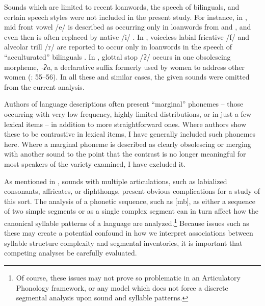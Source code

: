   Sounds which are limited to recent loanwords, the speech of bilinguals, and certain speech styles were not included in the present study. For instance, in , mid front vowel /e/ is described as occurring only in loanwords from  and , and even then is often replaced by native /i/ \citep[26]{Crawford1966}. In , voiceless labial fricative /f/ and alveolar trill /r/ are reported to occur only in loanwords in the speech of ``acculturated''  bilinguals \citep[13]{Kaufman1971}. In , glottal stop /ʔ/ occurs in one obsolescing morpheme, \textit{-ʔa}, a declarative suffix formerly used by women to address other women (\citealt{Cerrón-Palomino2006}: 55--56). In all these and similar cases, the given sounds were omitted from the current analysis.

  Authors of language descriptions often present ``marginal'' phonemes -- those occurring with very low frequency, highly limited distributions, or in just a few lexical items -- in addition to more straightforward ones. Where authors show these to be contrastive in lexical items, I have generally included such phonemes here. Where a marginal phoneme is described as clearly obsolescing or merging with another sound to the point that the contrast is no longer meaningful for most speakers of the variety examined, I have excluded it.

  As mentioned in , sounds with multiple articulations, such as labialized consonants, affricates, or diphthongs, present obvious complications for a study of this sort. The analysis of a phonetic sequence, such as [mb], as either a sequence of two simple segments or as a single complex segment can in turn affect how the canonical syllable patterns of a language are analyzed.\footnote{{Of course, these issues may not prove so problematic in an Articulatory Phonology framework, or any model which does not force a discrete segmental analysis upon sound and syllable patterns.}} Because issues such as these may create a potential confound in how we interpret associations between syllable structure complexity and segmental inventories, it is important that competing analyses be carefully evaluated. 

